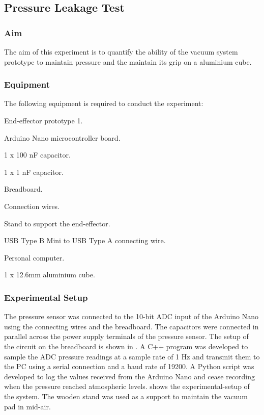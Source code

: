 \subsection{Pressure Leakage Test}

\subsubsection{Aim}

The aim of this experiment is to quantify the ability of the vacuum system prototype to maintain pressure and the maintain its grip on a aluminium cube.

\subsubsection{Equipment}

The following equipment is required to conduct the experiment:

\begin{compactitem}
    \item End-effector prototype 1.
    \item Arduino Nano microcontroller board.
    \item 1 x 100 nF capacitor.
    \item 1 x 1 nF capacitor.
    \item Breadboard.
    \item Connection wires.
    \item Stand to support the end-effector.
    \item USB Type B Mini to USB Type A connecting wire.
    \item Personal computer.
    \item 1 x 12.6mm aluminium cube.
\end{compactitem}

\subsubsection{Experimental Setup}

The pressure sensor was connected to the 10-bit ADC input of the Arduino Nano using the connecting wires and the breadboard. The capacitors were connected in parallel across the power supply terminals of the pressure sensor. The setup of the circuit on the breadboard is shown in . A C++ program was developed to sample the ADC pressure readings at a sample rate of 1 Hz and transmit them to the PC using a serial connection and a baud rate of 19200. A Python script was developed to log the values received from the Arduino Nano and cease recording when the pressure reached atmospheric levels.  shows the experimental-setup of the system. The wooden stand was used as a support to maintain the vacuum pad in mid-air.

